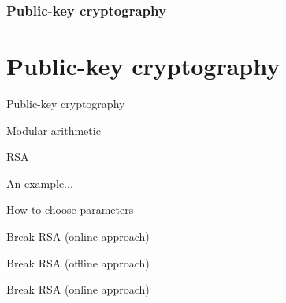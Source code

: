 \section{Public-key cryptography}
\part{Public-key cryptography}

\begin{frame}{Public-key cryptography}

\end{frame}

\begin{frame}{Modular arithmetic}

\end{frame}

\begin{frame}{RSA}

\end{frame}

\begin{frame}{An example...}

\end{frame}

\begin{frame}{How to choose parameters}

\end{frame}

\begin{frame}{Break RSA (online approach)}

\end{frame}

\begin{frame}{Break RSA (offline approach)}

\end{frame}

\begin{frame}{Break RSA (online approach)}

\end{frame}
